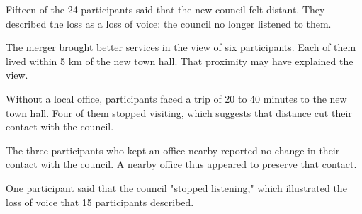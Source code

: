 \documentclass{article}
\begin{document}
Fifteen of the 24 participants said that the new council felt distant. They described the loss as a loss of voice: the council no longer listened to them.

The merger brought better services in the view of six participants. Each of them lived within 5 km of the new town hall. That proximity may have explained the view.

Without a local office, participants faced a trip of 20 to 40 minutes to the new town hall. Four of them stopped visiting, which suggests that distance cut their contact with the council.

The three participants who kept an office nearby reported no change in their contact with the council. A nearby office thus appeared to preserve that contact.

One participant said that the council "stopped listening," which illustrated the loss of voice that 15 participants described.


\end{document}
